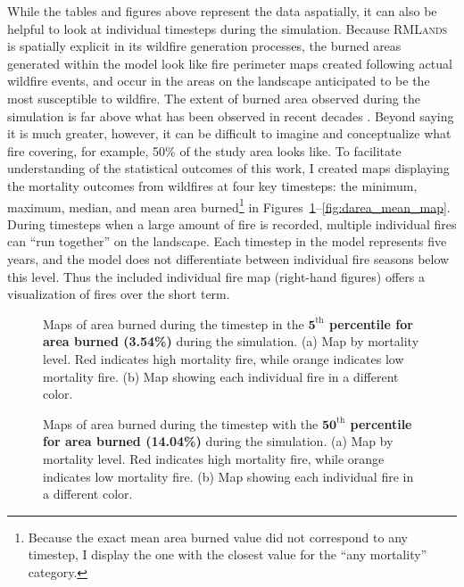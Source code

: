 While the tables and figures above represent the data aspatially, it can also be helpful to look at individual timesteps during the simulation. Because \textsc{RMLands} is spatially explicit in its wildfire generation processes, the burned areas generated within the model look like fire perimeter maps created following actual wildfire events, and occur in the areas on the landscape anticipated to be the most susceptible to wildfire. The extent of burned area observed during the simulation is far above what has been observed in recent decades \citep{calfire2012,usgs-fire-data2012}. Beyond saying it is much greater, however, it can be difficult to imagine and conceptualize what fire covering, for example, 50\% of the study area looks like. To facilitate understanding of the statistical outcomes of this work, I created maps displaying the mortality outcomes from wildfires at four key timesteps: the minimum, maximum, median, and mean area burned\footnote{Because the exact mean area burned value did not correspond to any timestep, I display the one with the closest value for the ``any mortality'' category.} in Figures~\ref{fig:darea_min_map}--\ref{fig:darea_mean_map}. During timesteps when a large amount of fire is recorded, multiple individual fires can ``run together'' on the landscape. Each timestep in the model represents five years, and the model does not differentiate between individual fire seasons below this level. Thus the included individual fire map (right-hand figures) offers a visualization of fires over the short term.

\newpage

\begin{figure}[!htbp]
  \centering
  \caption{Maps of area burned during the timestep in the \textbf{$\mathbf{5}^{\text{th}}$ percentile for area burned (3.54\%)} during the simulation. (a) Map by mortality level. Red indicates high mortality fire, while orange indicates low mortality fire. (b) Map showing each individual fire in a different color.}
  \label{fig:darea_min_map}
\end{figure}

\begin{figure}[!htbp]
  \centering
  \caption{Maps of area burned during the timestep with the \textbf{$\mathbf{50}^{\text{th}}$ percentile for area burned (14.04\%)} during the simulation. (a) Map by mortality level. Red indicates high mortality fire, while orange indicates low mortality fire. (b) Map showing each individual fire in a different color.}
  \label{fig:darea_median_map}
\end{figure}

